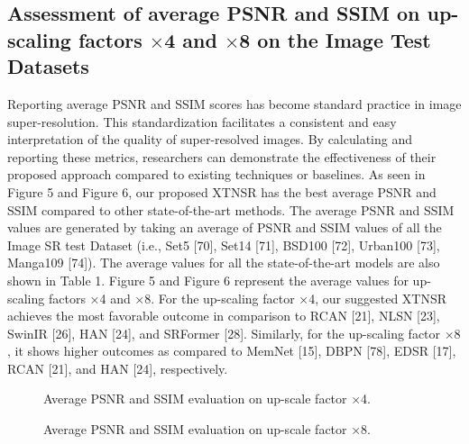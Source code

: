 \documentclass[twocolumn]{svjour3}          %
\begin{document}
\subsection{Assessment of average PSNR and SSIM on up-scaling factors $\times$4 and $\times$8 on the Image Test Datasets}

Reporting average PSNR and SSIM scores has become standard practice in image super-resolution. This standardization facilitates a consistent and easy interpretation of the quality of super-resolved images. By calculating and reporting these metrics, researchers can demonstrate the effectiveness of their proposed approach compared to existing techniques or baselines. As seen in Figure 5 and Figure 6, our proposed XTNSR has the best average PSNR and SSIM compared to other state-of-the-art methods. The average PSNR and SSIM values are generated by taking an average of PSNR and SSIM values of all the Image SR test Dataset (i.e., Set5 [70], Set14 [71], BSD100 [72], Urban100 [73], Manga109 [74]). The average values for all the state-of-the-art models are also shown in Table 1. Figure 5 and Figure 6 represent the average values for up-scaling factors ×4 and ×8. For the up-scaling factor ×4, our suggested XTNSR achieves the most favorable outcome in comparison to RCAN [21], NLSN [23], SwinIR [26], HAN [24], and SRFormer [28]. Similarly, for the up-scaling factor $\times8$, it shows higher outcomes as compared to MemNet [15], DBPN [78], EDSR [17], RCAN [21], and HAN [24], respectively.

\begin{figure}
  \centering
   \caption {Average PSNR and SSIM evaluation on up-scale factor ×4.}
    \label{fig:8}
\end{figure}

\begin{figure}
  \centering
   \caption {Average PSNR and SSIM evaluation on up-scale factor ×8.}
    \label{fig:9}
\end{figure}
\end{document}
